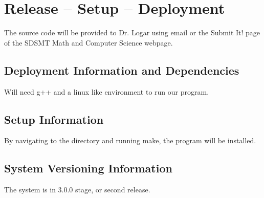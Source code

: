 
\chapter{Release -- Setup -- Deployment}
The source code will be provided to Dr. Logar using email or the Submit It! page of
the SDSMT Math and Computer Science webpage.


\section{Deployment Information and Dependencies}
Will need g++ and a linux like environment to run our program.


\section{Setup Information}
By navigating to the directory and running make, the program will be installed.


\section{System  Versioning Information}
The system is in 3.0.0 stage, or second release.
